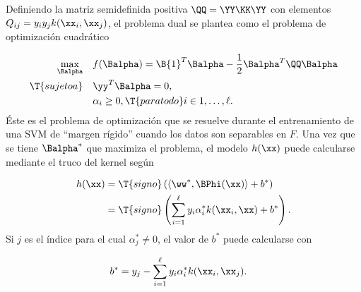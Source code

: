 
Definiendo la matriz semidefinida positiva $\QQ=\YY\KK\YY$ con elementos
$Q_{ij}=y_iy_jk(\xx_i,\xx_j)$, el problema dual se plantea como
el problema de optimización cuadrático

\begin{align}
\begin{split}
    \max_{\Balpha} \quad
    & f(\Balpha) = \B{1}^T\Balpha-\frac{1}{2}\Balpha^T\QQ\Balpha\\
    \T{sujeto a}\quad & \yy^T\Balpha = 0, \\
                      & \alpha_i\geq 0, \T{ para todo } i\in {1,\ldots,\ell }.
\end{split}\end{align}
Éste es el problema de optimización que se resuelve durante el
entrenamiento de una SVM de ``margen rígido'' cuando los datos son
separables en $F$. Una vez que se tiene $\Balpha^*$ que maximiza el problema,
el modelo $h(\xx)$ puede calcularse mediante el truco del kernel según

\begin{align}
  \begin{split}
    h(\xx) &= \T{signo}\left(\langle\ww^*,\BPhi(\xx)\rangle+b^*\right)\\
    &= \T{signo}\left(\sum_{i=1}^\ell{}y_i\alpha^*_ik(\xx_i,\xx)+b^*\right).
  \end{split}
\label{eq:svm-model-hard}
\end{align}
Si $j$ es el índice para el cual $\alpha^*_j\neq0$, el valor de $b^*$
puede calcularse con

\begin{align}
    b^* &= y_j - \sum_{i=1}^\ell{}y_i\alpha^*_ik(\xx_i,\xx_j).
\end{align}
